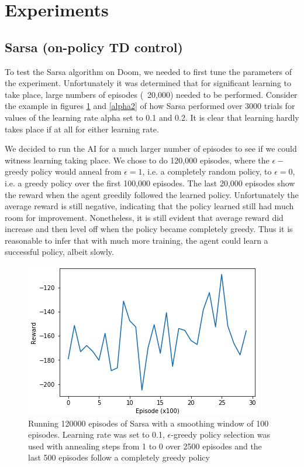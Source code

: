 \documentclass[letterpaper]{article} %
\begin{document}
\section{Experiments}
\subsection{Sarsa (on-policy TD control)}
To test the Sarsa algorithm on Doom, we needed to first tune the parameters of the experiment. Unfortunately it was determined that for significant learning to take place, large numbers of episodes (~20,000) needed to be performed. Consider the example in figures \ref{alpha1} and \ref{alpha2} of how Sarsa performed over 3000 trials for values of the learning rate alpha set to 0.1 and 0.2. It is clear that learning hardly takes place if at all for either learning rate. 

We decided to run the AI for a much larger number of episodes to see if we could witness learning taking place. We chose to do 120,000 episodes, where the $\epsilon-$greedy policy would anneal from $\epsilon = 1$, i.e. a completely random policy, to $\epsilon=0$, i.e. a greedy policy over the first 100,000 episodes. The last 20,000 episodes show the reward when the agent greedily followed the learned policy. Unfortunately the average reward is still negative, indicating that the policy learned still had much room for improvement. Nonetheless, it is still evident that average reward did increase and then level off when the policy became completely greedy. Thus it is reasonable to infer that with much more training, the agent could learn a successful policy, albeit slowly. 




\begin{figure}
\label{alpha1}
  \includegraphics[width = \columnwidth]{sarsa_3k_alpha1}
  \caption{Running 120000 episodes of Sarsa with a smoothing window of 100 episodes. Learning rate was set to 0.1, $\epsilon$-greedy policy selection was used with annealing steps from 1 to 0 over 2500 episodes and the last 500 episodes follow a completely greedy policy }
\end{figure}
\end{document}
